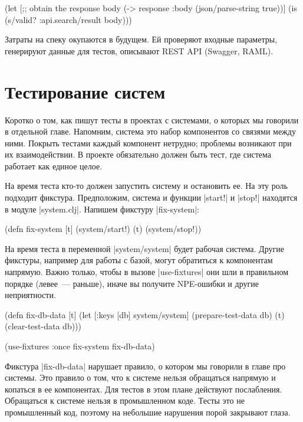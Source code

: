 \begin{english}
  \begin{clojure}
(let [;; obtain the response
      body (-> response :body (json/parse-string true))]
  (is (s/valid? :api.search/result body)))
  \end{clojure}
\end{english}

Затраты на спеку окупаются в будущем. Ей проверяют входные параметры, генерируют
данные для тестов, описывают REST API (Swagger, RAML).

\section{Тестирование систем}

Коротко о том, как пишут тесты в проектах с системами, о которых мы говорили в
отдельной главе. Напомним, система это набор компонентов со связями между
ними. Покрыть тестами каждый компонент нетрудно; проблемы возникают при их
взаимодействии. В проекте обязательно должен быть тест, где система работает как
единое целое.

На время теста кто-то должен запустить систему и остановить ее. На эту роль
подходит фикстура. Предположим, система и функции \spverb|start!| и
\spverb|stop!| находятся в модуле \spverb|system.clj|. Напишем фикстуру
\spverb|fix-system|:

\begin{english}
  \begin{clojure}
(defn fix-system [t]
  (system/start!)
  (t)
  (system/stop!))
  \end{clojure}
\end{english}

На время теста в переменной \spverb|system/system| будет рабочая система. Другие
фикстуры, например для работы с базой, могут обратиться к компонентам
напрямую. Важно только, чтобы в вызове \spverb|use-fixtures| они шли в
правильном порядке (левее~--- раньше), иначе вы получите NPE-ошибки и другие
неприятности.

\begin{english}
  \begin{clojure}
(defn fix-db-data [t]
  (let [{:keys [db]} system/system]
    (prepare-test-data db)
    (t)
    (clear-test-data db)))

(use-fixtures :once fix-system fix-db-data)
  \end{clojure}
\end{english}

Фикстура \spverb|fix-db-data| нарушает правило, о котором мы говорили в главе
про системы. Это правило о том, что к системе нельзя обращаться напрямую и
копаться в ее компонентах. Для тестов в этом плане действуют
послабления. Обращаться к системе нельзя в промышленном коде. Тесты это не
промышленный код, поэтому на небольшие нарушения порой закрывают глаза.

